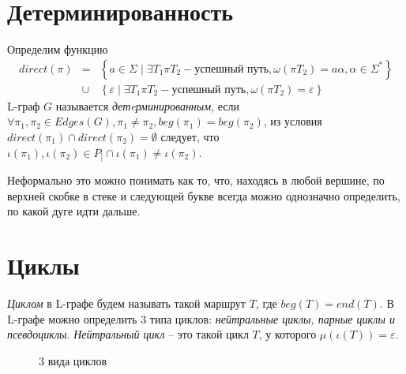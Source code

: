 \section{Детерминированность}
Определим функцию \begin{eqnarray*}
    direct(\pi) & = & \left\{ a \in \Sigma \mid \exists T_1 \pi T_2 - \text{успешный путь}, \omega(\pi T_2) = a \alpha, \alpha \in \Sigma^* \right\} \\
    & \cup & \left\{ \varepsilon \mid \exists T_1 \pi T_2 - \text{успешный путь}, \omega(\pi T_2) = \varepsilon \right\}
\end{eqnarray*}
L-граф $G$ называется \emph{детeрминированным}, если
$\forall \pi_1, \pi_2 \in Edges(G), \pi_1 \neq \pi_2, beg(\pi_1) = beg(\pi_2)$, 
из условия $direct(\pi_1) \cap direct(\pi_2) = \emptyset$ следует, что 
$\iota(\pi_1), \iota(\pi_2) \in P_] \cap \iota(\pi_1) \neq \iota(\pi_2)$. 

\begin{figure}[h]
    \begin{minipage}[h]{0.49\linewidth}
    \end{minipage}
    \hfill
    \begin{minipage}[h]{0.49\linewidth}
    \end{minipage}
    \label{det_vs_nondet}  
  \end{figure}

Неформально это можно понимать как то, что, находясь в любой вершине, 
по верхней скобке в стеке и следующей букве всегда можно однозначно определить, по какой дуге идти дальше.

\section{Циклы}

\emph{Циклом} в L-графе будем называть такой маршрут $T$, где $beg(T) = end(T)$. 
В L-графе можно определить 3 типа циклов: \emph{нейтральные циклы, парные циклы и псевдоциклы}.
\emph{Нейтральный цикл} -- это такой цикл $T$, у которого $\mu(\iota(T)) = \varepsilon$.

\begin{figure}
    \centering
    \qquad
    \qquad
    \caption{3 вида циклов}
    \label{loop-kinds-example}
\end{figure}


